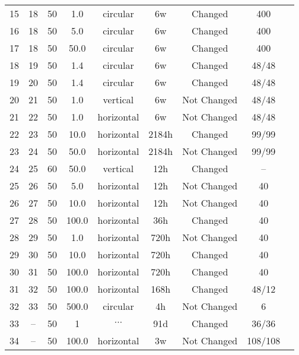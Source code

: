 \begin{tabular}{ccccccccc}
15& 18 & 50 & 1.0 & circular & 6w & Changed  & 400 & \citet{Kato1993} \\
16& 18 & 50 & 5.0 & circular & 6w & Changed  & 400 &  \citet{Kato1993} \\
17& 18 & 50 & 50.0 & circular & 6w & Changed  & 400 & \citet{Kato1993} \\
18& 19 & 50 & 1.4 & circular & 6w & Changed  & 48/48 & \citet{Kato1994a} \\
19& 20 & 50 & 1.4 & circular & 6w & Changed  & 48/48 & \citet{Kato1994b} \\
20& 21 & 50 & 1.0 & vertical & 6w & Not Changed  &48/48 &  \citet{Kato1994c} \\
21& 22 & 50 & 1.0 & horizontal & 6w & Not Changed  & 48/48 &  \citet{Kato1994c} \\
22& 23 & 50 & 10.0 & horizontal & 2184h & Changed  & 99/99 & \citet{Mevissen1996a} \\	
23& 24 & 50 & 50.0 & horizontal & 2184h & Not Changed  & 99/99 &\citet{Mevissen1996b} \\
24& 25 & 60 & 50.0 & vertical & 12h & Changed  & -- & \citet{Rosen1998} \\  
25& 26 & 50 & 5.0 & horizontal & 12h & Not Changed  &  40 &\citet{Selmaoui1995} \\
26& 27 & 50 & 10.0 & horizontal & 12h & Not Changed  & 40 & \citet{Selmaoui1995} \\
27& 28 & 50 & 100.0 & horizontal & 36h & Changed  &  40 &\citet{Selmaoui1995} \\
28& 29 & 50 & 1.0 & horizontal & 720h & Not Changed  & 40 & \citet{Selmaoui1995} \\
29& 30 & 50 & 10.0 & horizontal & 720h & Changed  &  40 &\citet{Selmaoui1995} \\
30& 31 & 50 & 100.0 & horizontal & 720h & Changed  & 40 & \citet{Selmaoui1995} \\
31& 32 & 50 & 100.0 & horizontal & 168h & Changed  & 48/12 & \citet{Selmaoui1999} \\
32& 33 & 50 & 500.0 & circular & 4h & Not Changed  & 6 & \citet{Tripp2003} \\
33& -- & 50 & 1 & $\cdots$ &  91d & Changed       & 36/36 & \citet{Loscher1994}\\ 
34& -- & 50 & 100.0 & horizontal & 3w  & Not Changed & 108/108 &\citet{Loscher1998} \\
\hline
\end{tabular}
